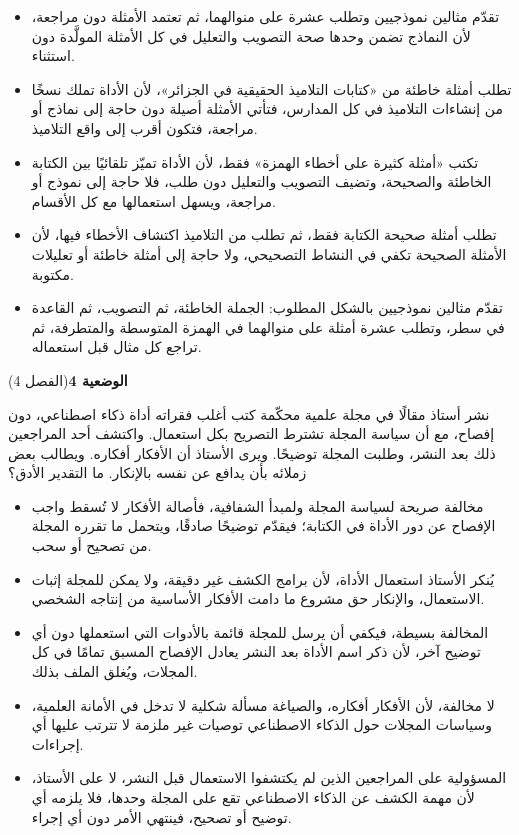 \documentclass[11pt,a4paper]{article}
\begin{document}
\begin{itemize}[leftmargin=1.0cm, labelsep=6pt, itemsep=3pt, topsep=4pt, parsep=0pt]
  \item[\textbf{أ)}] تقدّم مثالين نموذجيين وتطلب عشرة على منوالهما، ثم تعتمد الأمثلة دون مراجعة، لأن النماذج تضمن وحدها صحة التصويب والتعليل في كل الأمثلة المولَّدة دون استثناء.
  \item[\textbf{ب)}] تطلب أمثلة خاطئة من «كتابات التلاميذ الحقيقية في الجزائر»، لأن الأداة تملك نسخًا من إنشاءات التلاميذ في كل المدارس، فتأتي الأمثلة أصيلة دون حاجة إلى نماذج أو مراجعة، فتكون أقرب إلى واقع التلاميذ.
  \item[\textbf{ج)}] تكتب «أمثلة كثيرة على أخطاء الهمزة» فقط، لأن الأداة تميّز تلقائيًا بين الكتابة الخاطئة والصحيحة، وتضيف التصويب والتعليل دون طلب، فلا حاجة إلى نموذج أو مراجعة، ويسهل استعمالها مع كل الأقسام.
  \item[\textbf{د)}] تطلب أمثلة صحيحة الكتابة فقط، ثم تطلب من التلاميذ اكتشاف الأخطاء فيها، لأن الأمثلة الصحيحة تكفي في النشاط التصحيحي، ولا حاجة إلى أمثلة خاطئة أو تعليلات مكتوبة.
  \item[\textbf{هـ)}] تقدّم مثالين نموذجيين بالشكل المطلوب: الجملة الخاطئة، ثم التصويب، ثم القاعدة في سطر، وتطلب عشرة أمثلة على منوالهما في الهمزة المتوسطة والمتطرفة، ثم تراجع كل مثال قبل استعماله.
\end{itemize}
\par\vspace{6pt}
\noindent
{\large\khatt\textbf{الوضعية 4}}\hfill{\small(الفصل 4)}\par\nopagebreak\vspace{3pt}
\setlength{\fboxsep}{7pt}\colorbox{gray!10}{\parbox{\dimexpr\linewidth-14pt}{نشر أستاذ مقالًا في مجلة علمية محكّمة كتب أغلب فقراته أداة ذكاء اصطناعي، دون إفصاح، مع أن سياسة المجلة تشترط التصريح بكل استعمال. واكتشف أحد المراجعين ذلك بعد النشر، وطلبت المجلة توضيحًا. ويرى الأستاذ أن الأفكار أفكاره. ويطالب بعض زملائه بأن يدافع عن نفسه بالإنكار. ما التقدير الأدق؟}}\par\nopagebreak
\begin{itemize}[leftmargin=1.0cm, labelsep=6pt, itemsep=3pt, topsep=4pt, parsep=0pt]
  \item[\textbf{أ)}] مخالفة صريحة لسياسة المجلة ولمبدأ الشفافية، فأصالة الأفكار لا تُسقط واجب الإفصاح عن دور الأداة في الكتابة؛ فيقدّم توضيحًا صادقًا، ويتحمل ما تقرره المجلة من تصحيح أو سحب.
  \item[\textbf{ب)}] يُنكر الأستاذ استعمال الأداة، لأن برامج الكشف غير دقيقة، ولا يمكن للمجلة إثبات الاستعمال، والإنكار حق مشروع ما دامت الأفكار الأساسية من إنتاجه الشخصي.
  \item[\textbf{ج)}] المخالفة بسيطة، فيكفي أن يرسل للمجلة قائمة بالأدوات التي استعملها دون أي توضيح آخر، لأن ذكر اسم الأداة بعد النشر يعادل الإفصاح المسبق تمامًا في كل المجلات، ويُغلق الملف بذلك.
  \item[\textbf{د)}] لا مخالفة، لأن الأفكار أفكاره، والصياغة مسألة شكلية لا تدخل في الأمانة العلمية، وسياسات المجلات حول الذكاء الاصطناعي توصيات غير ملزمة لا تترتب عليها أي إجراءات.
  \item[\textbf{هـ)}] المسؤولية على المراجعين الذين لم يكتشفوا الاستعمال قبل النشر، لا على الأستاذ، لأن مهمة الكشف عن الذكاء الاصطناعي تقع على المجلة وحدها، فلا يلزمه أي توضيح أو تصحيح، فينتهي الأمر دون أي إجراء.
\end{itemize}
\end{document}
